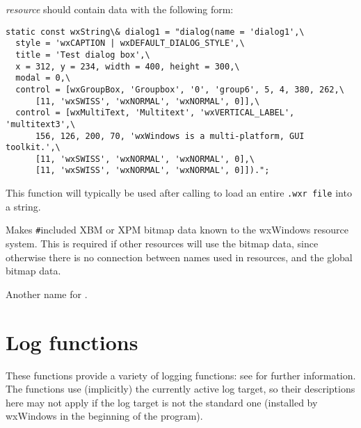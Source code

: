 {\it resource} should contain data with the following form:

\begin{verbatim}
static const wxString\& dialog1 = "dialog(name = 'dialog1',\
  style = 'wxCAPTION | wxDEFAULT_DIALOG_STYLE',\
  title = 'Test dialog box',\
  x = 312, y = 234, width = 400, height = 300,\
  modal = 0,\
  control = [wxGroupBox, 'Groupbox', '0', 'group6', 5, 4, 380, 262,\
      [11, 'wxSWISS', 'wxNORMAL', 'wxNORMAL', 0]],\
  control = [wxMultiText, 'Multitext', 'wxVERTICAL_LABEL', 'multitext3',\
      156, 126, 200, 70, 'wxWindows is a multi-platform, GUI toolkit.',\
      [11, 'wxSWISS', 'wxNORMAL', 'wxNORMAL', 0],\
      [11, 'wxSWISS', 'wxNORMAL', 'wxNORMAL', 0]]).";
\end{verbatim}

This function will typically be used after calling  to
load an entire {\tt .wxr file} into a string.

\membersection{::wxResourceRegisterBitmapData}\label{registerbitmapdata}



Makes \verb$#$included XBM or XPM bitmap data known to the wxWindows resource system. 
This is required if other resources will use the bitmap data, since otherwise there
is no connection between names used in resources, and the global bitmap data.


Another name for .

\section{Log functions}\label{logfunctions}

These functions provide a variety of logging functions: see  for
further information. The functions use (implicitly) the currently active log
target, so their descriptions here may not apply if the log target is not the
standard one (installed by wxWindows in the beginning of the program).

